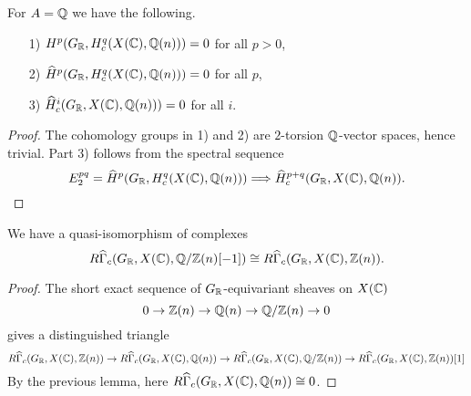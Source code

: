 \documentclass{article}
\numberwithin{equation}{section}
\begin{document}
\begin{lemma}
  For $A = \mathbb{Q}$ we have the following.

  \begin{enumerate}
  \item[1)] $H^p (G_{\mathbb{R}}, H_c^q (X (\mathbb{C}), \mathbb{Q} (n))) = 0$ for all $p > 0$,

  \item[2)] $\widehat{H}^p (G_{\mathbb{R}}, H_c^q (X (\mathbb{C}), \mathbb{Q} (n))) = 0$ for all $p$,

  \item[3)] $\widehat{H}^i_c (G_{\mathbb{R}}, X (\mathbb{C}), \mathbb{Q} (n))) = 0$ for all $i$.
  \end{enumerate}

  \begin{proof}
    The cohomology groups in 1) and 2) are $2$-torsion $\mathbb{Q}$-vector spaces,
    hence trivial. Part 3) follows from the spectral sequence
    \[ E_2^{pq} = \widehat{H}^p (G_{\mathbb{R}}, H^q_c (X (\mathbb{C}), \mathbb{Q} (n)))
    \Longrightarrow
    \widehat{H}^{p+q}_c (G_{\mathbb{R}}, X (\mathbb{C}), \mathbb{Q} (n)). \qedhere \]
  \end{proof}
\end{lemma}

\begin{lemma}
  We have a quasi-isomorphism of complexes
  \[ R\widehat{\Gamma}_c (G_{\mathbb{R}}, X (\mathbb{C}), \mathbb{Q}/\mathbb{Z} (n) [-1]) \cong
  R\widehat{\Gamma}_c (G_{\mathbb{R}}, X (\mathbb{C}), \mathbb{Z} (n)).\]

  \begin{proof}
    The short exact sequence of $G_{\mathbb{R}}$-equivariant sheaves on $X (\mathbb{C})$
    $$0 \to \mathbb{Z} (n) \to \mathbb{Q} (n) \to \mathbb{Q}/\mathbb{Z} (n) \to 0$$
    gives a distinguished triangle
    \[ R\widehat{\Gamma}_c (G_{\mathbb{R}}, X (\mathbb{C}), \mathbb{Z} (n)) \to
    R\widehat{\Gamma}_c (G_{\mathbb{R}}, X (\mathbb{C}), \mathbb{Q} (n)) \to
    R\widehat{\Gamma}_c (G_{\mathbb{R}}, X (\mathbb{C}), \mathbb{Q}/\mathbb{Z} (n)) \to
    R\widehat{\Gamma}_c (G_{\mathbb{R}}, X (\mathbb{C}), \mathbb{Z} (n)) [1] \]
    By the previous lemma, here
    $R\widehat{\Gamma}_c (G_{\mathbb{R}}, X (\mathbb{C}), \mathbb{Q} (n)) \cong 0$.
  \end{proof}
\end{lemma}
\end{document}
